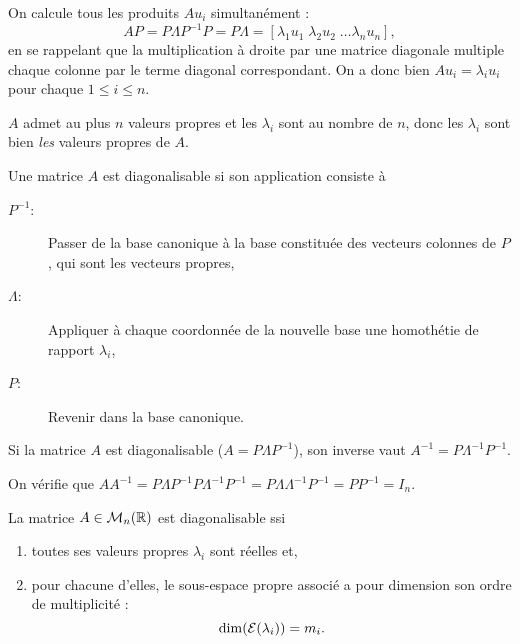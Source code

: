\proof
  On calcule tous les produits $A u_i$ simultanément : 
  $$
  A P 
  = P \Lambda P^{-1} P 
  = P \Lambda
  = [\lambda_1 u_1 \; \lambda_2 u_2 \; \dots \lambda_n u_n],
  $$
  en se rappelant que la multiplication à droite par une matrice diagonale multiple chaque colonne par le terme diagonal correspondant. On a donc bien $A u_i = \lambda_i u_i$ pour chaque $1 \leq i \leq n$. \\
\eproof

\remark
$A$ admet au plus $n$ valeurs propres et les $\lambda_i$ sont au nombre de $n$, donc les $\lambda_i$ sont bien {\em les} valeurs propres de $A$.

\remark
Une matrice $A$ est diagonalisable si son application consiste à
\begin{description}
 \item[$P^{-1}$:] Passer de la base canonique à la base constituée des vecteurs colonnes de $P$, qui sont les vecteurs propres,
 \item[$\Lambda$:] Appliquer à chaque coordonnée de la nouvelle base une homothétie de rapport $\lambda_i$,
 \item[$P$:] Revenir dans la base canonique.
\end{description}



\begin{proposition}
  Si la matrice $A$ est diagonalisable ($A = P \Lambda P^{-1}$), son inverse vaut $A^{-1} = P \Lambda^{-1} P^{-1}$.
\end{proposition}

\proof
On vérifie que $A A^{-1} = P \Lambda P^{-1} P \Lambda^{-1} P^{-1} = P \Lambda \Lambda^{-1} P^{-1} = P P^{-1} = I_n$.
\eproof

\begin{theorem}
  La matrice $A \in \mathcal{M}_n(\mathbb{R})$ est diagonalisable ssi 
  \begin{enumerate}
   \item toutes ses valeurs propres $\lambda_i$ sont réelles et, 
   \item pour chacune d'elles, le sous-espace propre associé a pour dimension son ordre de multiplicité : 
   $$
   \dim(\mathcal{E}(\lambda_i)) = m_i.
   $$
  \end{enumerate}
\end{theorem}

